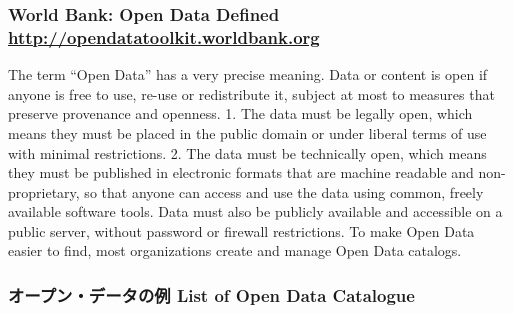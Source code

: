 \documentclass[
]{book}
\theoremstyle{definition}
\theoremstyle{definition}
\theoremstyle{definition}
\theoremstyle{definition}
\theoremstyle{remark}
\begin{document}
\hypertarget{world-bank-open-data-defined-httpopendatatoolkit.worldbank.org}{%
\subsubsection{\texorpdfstring{World Bank: Open Data Defined \url{http://opendatatoolkit.worldbank.org}}{World Bank: Open Data Defined http://opendatatoolkit.worldbank.org}}\label{world-bank-open-data-defined-httpopendatatoolkit.worldbank.org}}

The term ``Open Data'' has a very precise meaning. Data or content is open if anyone is free to use, re-use or redistribute it, subject at most to measures that preserve provenance and openness.
1. The data must be legally open, which means they must be placed in the public domain or under liberal terms of use with minimal restrictions.
2. The data must be technically open, which means they must be published in electronic formats that are
machine readable and non-proprietary, so that anyone can access and use the data using common, freely available software tools. Data must also be publicly available and accessible on a public server, without password or firewall restrictions. To make Open Data easier to find, most organizations create and manage Open Data catalogs.

\hypertarget{ux30aaux30fcux30d7ux30f3ux30c7ux30fcux30bfux306eux4f8b-list-of-open-data-catalogue}{%
\subsubsection{オープン・データの例 List of Open Data Catalogue}\label{ux30aaux30fcux30d7ux30f3ux30c7ux30fcux30bfux306eux4f8b-list-of-open-data-catalogue}}
\end{document}
